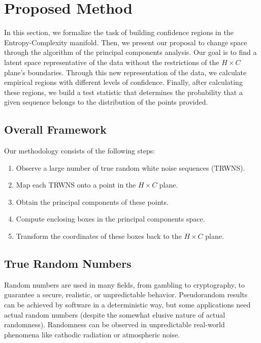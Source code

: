 \section{Proposed Method}\label{Sec:Proposal}

In this section, we formalize the task of building confidence regions in the Entropy-Complexity manifold.
Then, we present our proposal to change space through the algorithm of the principal components analysis.
Our goal is to find a latent space representative of the data without the restrictions of the $H\times C$ plane's boundaries.
Through this new representation of the data, we calculate empirical regions with different levels of confidence.
Finally, after calculating these regions, we build a test statistic that determines the probability that a given sequence belongs to the distribution of the points provided.

\subsection{Overall Framework}\label{Sec:OverallFramework}

Our methodology consists of the following steps:
\begin{enumerate}
	\item\label{item:Methodology1} Observe a large number of true random white noise sequences (TRWNS).
	\item\label{item:Methodology2} Map each TRWNS onto a point in the $H\times C$ plane.
	\item\label{item:Methodology3} Obtain the principal components of these points.
	\item\label{item:Methodology4} Compute enclosing boxes in the principal components space.
	\item\label{item:Methodology5} Transform the coordinates of these boxes back to the $H\times C$ plane.
\end{enumerate}

\subsection{True Random Numbers}\label{Sec:TRNG}

Random numbers are used in many fields, from gambling to cryptography, to guarantee a secure, realistic, or unpredictable behavior. 
Pseudorandom results can be achieved by software in a deterministic way, but some applications need actual random numbers (despite the somewhat elusive nature of actual randomness).
Randomness can be observed in unpredictable real-world phenomena like cathodic radiation or atmospheric noise.

